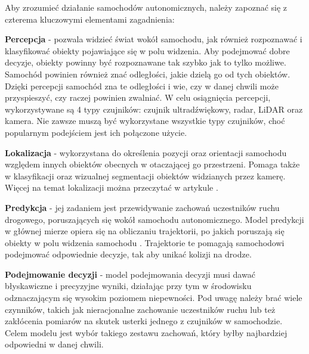 Aby zrozumieć działanie samochodów autonomicznych, należy zapoznać się z czterema kluczowymi elementami zagadnienia:
\begin{enumerate*}
\item \textbf{Percepcja} - pozwala widzieć świat wokół samochodu, jak również rozpoznawać i klasyfikować obiekty pojawiające się w polu widzenia. Aby podejmować dobre decyzje, obiekty powinny być rozpoznawane tak szybko jak to tylko możliwe. Samochód powinien również znać odległości, jakie dzielą go od tych obiektów. Dzięki percepcji samochód zna te odległości i wie, czy w danej chwili może przyspieszyć, czy raczej powinien zwalniać. W celu osiągnięcia percepcji, wykorzystywane są 4 typy czujników: czujnik ultradźwiękowy, radar, LiDAR oraz kamera. Nie zawsze muszą być wykorzystane wszystkie typy czujników, choć popularnym podejściem jest ich połączone użycie.
\item \textbf{Lokalizacja} - wykorzystana do określenia pozycji oraz orientacji samochodu względem innych obiektów obecnych w otaczającej go przestrzeni. Pomaga także w klasyfikacji oraz wizualnej segmentacji obiektów widzianych przez kamerę. Więcej na temat lokalizacji można przeczytać w artykule \cite{nvidia:localisation}.
\item \textbf{Predykcja} - jej zadaniem jest przewidywanie zachowań uczestników ruchu drogowego, poruszających się wokół samochodu autonomicznego. Model predykcji w głównej mierze opiera się na obliczaniu trajektorii, po jakich poruszają się obiekty w polu widzenia samochodu \cite{singh:prediction}. Trajektorie te pomagają samochodowi podejmować odpowiednie decyzje, tak aby unikać kolizji na drodze.
\item \textbf{Podejmowanie decyzji} - model podejmowania decyzji musi dawać błyskawiczne i precyzyjne wyniki, działając przy tym w środowisku odznaczającym się wysokim poziomem niepewności. Pod uwagę należy brać wiele czynników, takich jak nieracjonalne zachowanie uczestników ruchu lub też zakłócenia pomiarów na skutek usterki jednego z czujników w samochodzie. Celem modelu jest wybór takiego zestawu zachowań, który byłby najbardziej odpowiedni w danej chwili.
\end{enumerate*}

